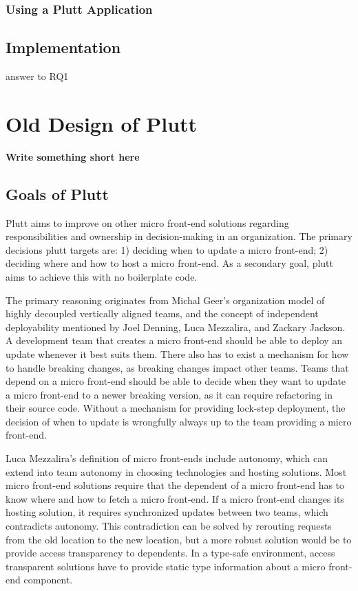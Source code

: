\subsection{Using a Plutt Application}


\section{Implementation}

answer to RQ1


\chapter{Old Design of Plutt}

\textbf{Write something short here}

\section{Goals of Plutt}

Plutt aims to improve on other micro front-end solutions regarding responsibilities and ownership in decision-making in an organization. The primary decisions plutt targets are: 1) deciding when to update a micro front-end; 2) deciding where and how to host a micro front-end. As a secondary goal, plutt aims to achieve this with no boilerplate code.

The primary reasoning originates from Michal Geer's organization model of highly decoupled vertically aligned teams, and the concept of independent deployability mentioned by Joel Denning, Luca Mezzalira, and Zackary Jackson. A development team that creates a micro front-end should be able to deploy an update whenever it best suits them. There also has to exist a mechanism for how to handle breaking changes, as breaking changes impact other teams. Teams that depend on a micro front-end should be able to decide when they want to update a micro front-end to a newer breaking version, as it can require refactoring in their source code. Without a mechanism for providing lock-step deployment, the decision of when to update is wrongfully always up to the team providing a micro front-end.

Luca Mezzalira's definition of micro front-ends include autonomy, which can extend into team autonomy in choosing technologies and hosting solutions. Most micro front-end solutions require that the dependent of a micro front-end has to know where and how to fetch a micro front-end. If a micro front-end changes its hosting solution, it requires synchronized updates between two teams, which contradicts autonomy. This contradiction can be solved by rerouting requests from the old location to the new location, but a more robust solution would be to provide access transparency to dependents. In a type-safe environment, access transparent solutions have to provide static type information about a micro front-end component.

